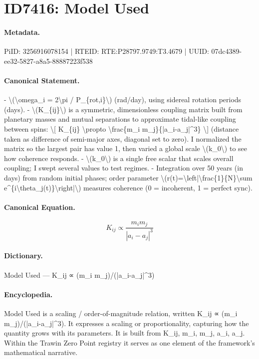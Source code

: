 \section*{ID7416: Model Used}
\paragraph{Metadata.}
PiID: 3256916078154 | RTEID: RTE:P28797.9749:T3.4679 | UUID: 07dc4389-ee32-5827-a8a5-88887223f538

\paragraph{Canonical Statement.}
- \textbackslash{}(\textbackslash{}omega\_i = 2\textbackslash{}pi / P\_\{rot,i\}\textbackslash{}) (rad/day), using sidereal rotation periods (days). - \textbackslash{}(K\_\{ij\}\textbackslash{}) is a symmetric, dimensionless coupling matrix built from planetary masses and mutual separations to approximate tidal-like coupling between spins: \textbackslash{}[ K\_\{ij\} \textbackslash{}propto \textbackslash{}frac\{m\_i m\_j\}\{|a\_i-a\_j|\textasciicircum{}3\} \textbackslash{}] (distance taken as difference of semi-major axes, diagonal set to zero). I normalized the matrix so the largest pair has value 1, then varied a global scale \textbackslash{}(k\_0\textbackslash{}) to see how coherence responds. - \textbackslash{}(k\_0\textbackslash{}) is a single free scalar that scales overall coupling; I swept several values to test regimes. - Integration over 50 years (in days) from random initial phases; order parameter \textbackslash{}(r(t)=\textbackslash{}left|\textbackslash{}frac\{1\}\{N\}\textbackslash{}sum e\textasciicircum{}\{i\textbackslash{}theta\_j(t)\}\textbackslash{}right|\textbackslash{}) measures coherence (0 = incoherent, 1 = perfect sync).

\paragraph{Canonical Equation.}
\[
K_{ij} \propto \frac{m_i m_j}{|a_i-a_j|^3}
\]

\paragraph{Dictionary.}
Model Used — K\_ij ∝ (m\_i m\_j)/(|a\_i-a\_j|\textasciicircum{}3)

\paragraph{Encyclopedia.}
Model Used is a scaling / order-of-magnitude relation, written K\_ij ∝ (m\_i m\_j)/(|a\_i-a\_j|\textasciicircum{}3). It expresses a scaling or proportionality, capturing how the quantity grows with its parameters. It is built from K\_ij, m\_i, m\_j, a\_i, a\_j. Within the Trawin Zero Point registry it serves as one element of the framework's mathematical narrative.

